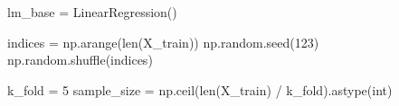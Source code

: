 \documentclass[
  letterpaper,
  DIV=11,
  numbers=noendperiod]{scrreprt}
\newenvironment{Shaded}{\begin{snugshade}}{\end{snugshade}}
\newcommand{\BuiltInTok}[1]{\textcolor[rgb]{0.00,0.23,0.31}{#1}}
\newcommand{\DecValTok}[1]{\textcolor[rgb]{0.68,0.00,0.00}{#1}}
\newcommand{\NormalTok}[1]{\textcolor[rgb]{0.00,0.23,0.31}{#1}}
\newcommand{\OperatorTok}[1]{\textcolor[rgb]{0.37,0.37,0.37}{#1}}
\begin{document}
\begin{Shaded}
\begin{Highlighting}[]
\NormalTok{lm\_base }\OperatorTok{=}\NormalTok{ LinearRegression()}
\end{Highlighting}
\end{Shaded}

\begin{Shaded}
\begin{Highlighting}[]
\NormalTok{indices }\OperatorTok{=}\NormalTok{ np.arange(}\BuiltInTok{len}\NormalTok{(X\_train))}
\NormalTok{np.random.seed(}\DecValTok{123}\NormalTok{)}
\NormalTok{np.random.shuffle(indices)}

\NormalTok{k\_fold }\OperatorTok{=} \DecValTok{5}
\NormalTok{sample\_size }\OperatorTok{=}\NormalTok{ np.ceil(}\BuiltInTok{len}\NormalTok{(X\_train) }\OperatorTok{/}\NormalTok{ k\_fold).astype(}\BuiltInTok{int}\NormalTok{)}
\end{Highlighting}
\end{Shaded}
\end{document}
